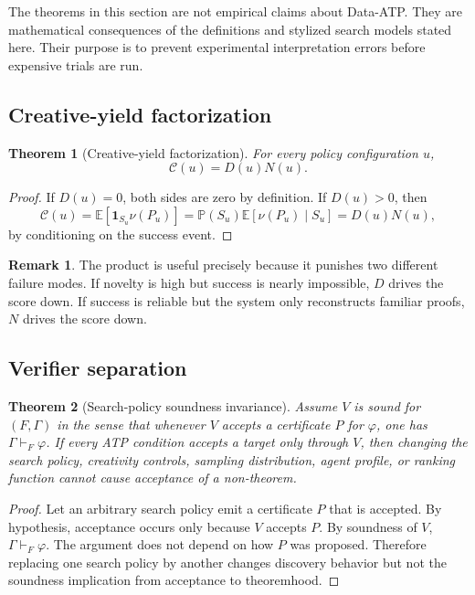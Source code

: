 \documentclass[11pt]{article}
\theoremstyle{datatheorem}
\newtheorem{theorem}{Theorem}[section]
\theoremstyle{definition}
\newtheorem{remark}{Remark}[section]
\newcommand{\E}{\mathbb{E}}
\newcommand{\Prb}{\mathbb{P}}
\newcommand{\ind}{\mathbf{1}}
\newcommand{\cY}{\mathcal{C}}
\begin{document}
The theorems in this section are not empirical claims about Data-ATP. They are mathematical consequences of the definitions and stylized search models stated here. Their purpose is to prevent experimental interpretation errors before expensive trials are run.

\subsection{Creative-yield factorization}

\begin{theorem}[Creative-yield factorization]\label{thm:factor}
For every policy configuration $u$,
\[
\cY(u)=D(u)N(u).
\]
\end{theorem}

\begin{proof}
If $D(u)=0$, both sides are zero by definition. If $D(u)>0$, then
\[
\cY(u)
=\E[\ind_{S_u}\nu(P_u)]
=\Prb(S_u)\E[\nu(P_u)\mid S_u]
=D(u)N(u),
\]
by conditioning on the success event.
\end{proof}

\begin{remark}
The product is useful precisely because it punishes two different failure modes. If novelty is high but success is nearly impossible, $D$ drives the score down. If success is reliable but the system only reconstructs familiar proofs, $N$ drives the score down.
\end{remark}

\subsection{Verifier separation}

\begin{theorem}[Search-policy soundness invariance]\label{thm:verifier}
Assume $V$ is sound for $(F,\Gamma)$ in the sense that whenever $V$ accepts a certificate $P$ for $\varphi$, one has $\Gamma\vdash_F\varphi$. If every ATP condition accepts a target only through $V$, then changing the search policy, creativity controls, sampling distribution, agent profile, or ranking function cannot cause acceptance of a non-theorem.
\end{theorem}

\begin{proof}
Let an arbitrary search policy emit a certificate $P$ that is accepted. By hypothesis, acceptance occurs only because $V$ accepts $P$. By soundness of $V$, $\Gamma\vdash_F\varphi$. The argument does not depend on how $P$ was proposed. Therefore replacing one search policy by another changes discovery behavior but not the soundness implication from acceptance to theoremhood.
\end{proof}
\end{document}
